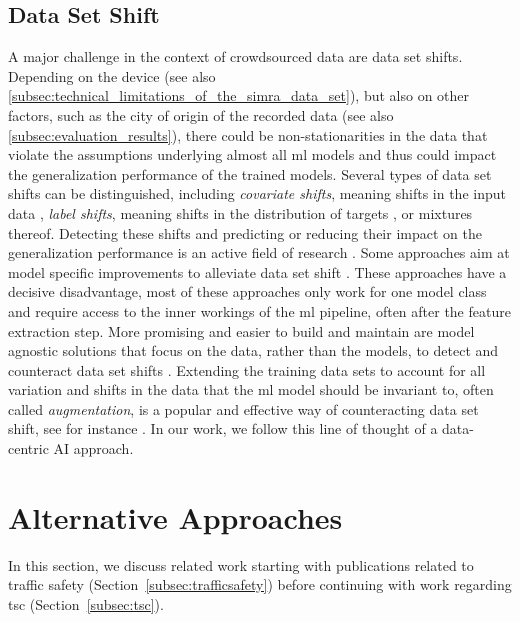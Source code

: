 \subsection{Data Set Shift}
\label{subsec:data_set_shift}
A major challenge in the context of crowdsourced data are data set shifts.
Depending on the device (see also \autoref{subsec:technical_limitations_of_the_simra_data_set}), but also on other factors, such as the city of origin of the recorded data (see also \autoref{subsec:evaluation_results}), there could be non-stationarities in the data that violate the assumptions underlying almost all \ac{ml} models and thus could impact the generalization performance of the trained models.
Several types of data set shifts can be distinguished, including \textit{covariate shifts}, meaning shifts in the input data \cite{sugiyama2012machine}, \textit{label shifts}, meaning shifts in the distribution of targets \cite{lipton2018detecting}, or mixtures thereof.
Detecting these shifts \cite{polyzotis2018data, rabanser2019failing, polyzotis2019data, abdar2021review, bates2023testing} and predicting \cite{schelter2020learning} or reducing their impact on the generalization performance is an active field of research \cite{schelter2015challenges, biessmann2021automated}.
Some approaches aim at model specific improvements to alleviate data set shift \cite{sugiyama2012machine}.
These approaches have a decisive disadvantage, most of these approaches only work for one model class and require access to the inner workings of the \ac{ml} pipeline, often after the feature extraction step.
More promising and easier to build and maintain are model agnostic solutions that focus on the data, rather than the models, to detect and counteract data set shifts \cite{biessmann2021automated}.
Extending the training data sets to account for all variation and shifts in the data that the \ac{ml} model should be invariant to, often called \textit{augmentation}, is a popular and effective way of counteracting data set shift, see for instance \cite{cubuk2019autoaugment}.
In our work, we follow this line of thought of a data-centric AI approach.


\section{Alternative Approaches}
\label{sec:related_work_cyclesense}
In this section, we discuss related work starting with publications related to traffic safety (Section~\ref{subsec:trafficsafety}) before continuing with work regarding \acl{tsc} (Section~\ref{subsec:tsc}).

